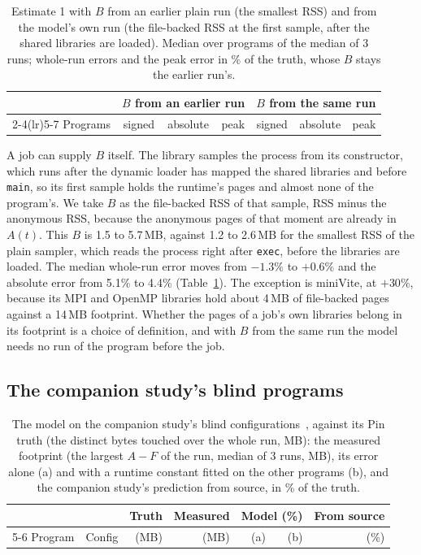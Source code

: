 \documentclass[11pt]{article}
\newcommand{\tabref}[1]{Table~\ref{#1}}
\begin{document}
\begin{table}[!htbp]
\centering
\small
\caption{Estimate 1 with $B$ from an earlier plain run (the smallest RSS) and from the model's own run (the
file-backed RSS at the first sample, after the shared libraries are loaded). Median over programs of the median of 3
runs; whole-run errors and the peak error in \% of the truth, whose $B$ stays the earlier run's.}
\label{tab:inrun}
\setlength{\tabcolsep}{4pt}
\begin{tabular}{lrrrrrr}
\toprule
 & \multicolumn{3}{c}{$B$ from an earlier run} & \multicolumn{3}{c}{$B$ from the same run} \\
\cmidrule(lr){2-4}\cmidrule(lr){5-7}
Programs & signed & absolute & peak & signed & absolute & peak \\
\midrule

\bottomrule
\end{tabular}
\end{table}

A job can supply $B$ itself. The library samples the process from its constructor, which runs after the dynamic
loader has mapped the shared libraries and before \texttt{main}, so its first sample holds the runtime's pages and
almost none of the program's. We take $B$ as the file-backed RSS of that sample, RSS minus the anonymous RSS, because
the anonymous pages of that moment are already in $A(t)$. This $B$ is 1.5 to 5.7\,MB, against 1.2 to 2.6\,MB for the
smallest RSS of the plain sampler, which reads the process right after \texttt{exec}, before the libraries are
loaded. The median whole-run error moves from $-1.3\%$ to $+0.6\%$ and the absolute error from 5.1\% to 4.4\%
(\tabref{tab:inrun}). The exception is miniVite, at $+30\%$, because its MPI and OpenMP libraries hold about 4\,MB of
file-backed pages against a 14\,MB footprint. Whether the pages of a job's own libraries belong in its footprint is a
choice of definition, and with $B$ from the same run the model needs no run of the program before the job.

\subsection{The companion study's blind programs}

\begin{table}[!htbp]
\centering
\small
\caption{The model on the companion study's blind configurations~\cite{memprintstatic}, against its Pin truth (the
distinct bytes touched over the whole run, MB): the measured footprint (the largest $A - F$ of the run, median of 3
runs, MB), its error alone (a) and with a runtime constant fitted on the other programs (b), and the companion
study's prediction from source, in \% of the truth.}
\label{tab:blind}
\setlength{\tabcolsep}{4pt}
\begin{tabular}{llrrrrr}
\toprule
 & & Truth & Measured & \multicolumn{2}{c}{Model (\%)} & From source \\
\cmidrule(lr){5-6}
Program & Config & (MB) & (MB) & (a) & (b) & (\%) \\
\midrule

\bottomrule
\end{tabular}
\end{table}
\end{document}
